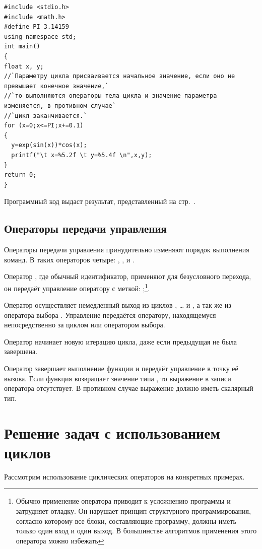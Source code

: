 \begin{lstlisting}
#include <stdio.h>
#include <math.h>
#define PI 3.14159
using namespace std;
int main()
{
float x, y;
//`Параметру цикла присваивается начальное значение, если оно не превышает конечное значение,`
//`то выполняются операторы тела цикла и значение параметра изменяется, в противном случае`
//`цикл заканчивается.`
for (x=0;x<=PI;x+=0.1)
{
  y=exp(sin(x))*cos(x);
  printf("\t x=%5.2f \t y=%5.4f \n",x,y);
}
return 0;
}
\end{lstlisting}

Программный код выдаст результат, представленный на стр.~\pageref{ch03:out0}.%

\subsection[Операторы передачи управления]{Операторы передачи управления}
Операторы передачи управления принудительно изменяют порядок выполнения команд. В  таких операторов четыре:
, ,  и .

Оператор  , где  обычный идентификатор, применяют
для безусловного перехода, он передаёт управление оператору с меткой: 
;\footnote{Обычно применение оператора  приводит к усложнению
программы и затрудняет отладку. Он нарушает принцип структурного программирования, согласно которому все блоки,
составляющие программу, должны иметь только один вход и один выход. В большинстве алгоритмов применения этого оператора
можно избежать}.

Оператор  осуществляет немедленный выход из циклов ,
… и , а так же из оператора выбора
. Управление передаётся оператору, находящемуся непосредственно за циклом или оператором
выбора. 

Оператор  начинает новую итерацию цикла, даже если предыдущая не была завершена. 

Оператор   завершает выполнение функции и передаёт управление в
точку её вызова. Если функция возвращает значение типа , то выражение в записи оператора
отсутствует. В противном случае выражение должно иметь скалярный тип.

\section[Решение задач с использованием циклов]{Решение задач с использованием циклов}
Рассмотрим использование циклических операторов на конкретных примерах.


